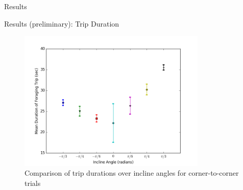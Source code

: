 \begin{section}{Results}
\begin{frame}{Results (preliminary): Trip Duration}
\begin{figure}
\includegraphics[width=0.8\textwidth]{results/corner-to-cornermeandurationofforagingtrip.png}
\caption{Comparison of trip durations over incline angles for corner-to-corner trials}
\end{figure}
\end{frame}



\end{section}
